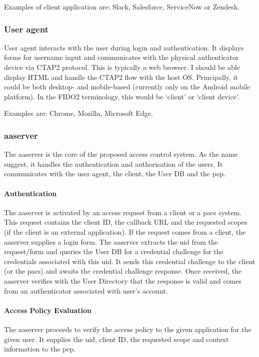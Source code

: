 Examples of client application are: Slack, Salesforce, ServiceNow or Zendesk.

\subsubsection{User agent}
User agent interacts with the user during login and authentication. It displays forms for username input and communicates with the physical authenticator device via CTAP2 protocol. This is typically a web browser. I should be able display HTML and handle the CTAP2 flow with the host OS. Principally, it could be both desktop- and mobile-based (currently only on the Android mobile platform). In the FIDO2 terminology, this would be `client' or `client device'.
    
Examples are: Chrome, Mozilla, Microsoft Edge.
    
\subsubsection{\acrlong{aaserver}} 
The \acrfull{aaserver} is the core of the proposed access control system. As the name suggest, it handles the authentication and authorisation of the users. It communicates with the user agent, the client, the User DB and the \acrshort{pep}.
    
\paragraph{Authentication}
The \acrshort{aaserver} is activated by an access request from a client or a \acrshort{pacs} system. This request contains the client ID, the callback URL and the requested scopes (if the client is an external application). If the request comes from a client, the \acrshort{aaserver} supplies a login form. The \acrshort{aaserver} extracts the \acrshort{uid} from the request/form and queries the User DB for a credential challenge for the credentials associated with this \acrshort{uid}. It sends this credential challenge to the client (or the \acrshort{pacs}) and awaits the credential challenge response. Once received, the \acrshort{aaserver} verifies with the User Directory that the response is valid and comes from an authenticator associated with user's account.

\paragraph{Access Policy Evaluation}
The \acrshort{aaserver} proceeds to verify the access policy to the given application for the given user. It supplies the \acrshort{uid}, client ID, the requested scope and context information to the \acrshort{pep}.


